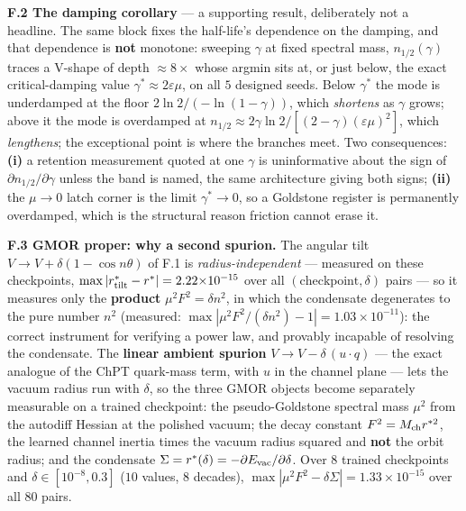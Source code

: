 \documentclass{article}
\begin{document}
\textbf{F.2 The damping corollary} --- a supporting result, deliberately not a headline. The same block fixes the half-life's dependence on the damping, and that dependence is \textbf{not} monotone: sweeping $\gamma$ at fixed spectral mass, $n_{1/2}(\gamma)$ traces a V-shape of depth $\approx8\times$ whose argmin sits at, or just below, the exact critical-damping value $\gamma^*\approx2\varepsilon\mu$, on all $5$ designed seeds. Below $\gamma^*$ the mode is underdamped at the floor $2\ln2/(-\ln(1-\gamma))$, which \emph{shortens} as $\gamma$ grows; above it the mode is overdamped at $n_{1/2}\approx2\gamma\ln2/[(2-\gamma)(\varepsilon\mu)^2]$, which \emph{lengthens}; the exceptional point is where the branches meet. Two consequences: \textbf{(i)} a retention measurement quoted at one $\gamma$ is uninformative about the sign of $\partial n_{1/2}/\partial\gamma$ unless the band is named, the same architecture giving both signs; \textbf{(ii)} the $\mu\to0$ latch corner is the limit $\gamma^*\to0$, so a Goldstone register is permanently overdamped, which is the structural reason friction cannot erase it.

\textbf{F.3 GMOR proper: why a second spurion.} The angular tilt $V\to V+\delta(1-\cos n\theta)$ of F.1 is \emph{radius-independent} --- measured on these checkpoints, $\max|r^*_{\rm tilt}-r^*|=2.22{\times}10^{-15}$ over all $(\text{checkpoint},\delta)$ pairs --- so it measures only the \textbf{product} $\mu^2F^2=\delta n^2$, in which the condensate degenerates to the pure number $n^2$ (measured: $\max|\mu^2F^2/(\delta n^2)-1|=1.03{\times}10^{-11}$): the correct instrument for verifying a power law, and provably incapable of resolving the condensate. The \textbf{linear ambient spurion} $V\to V-\delta\,(u\cdot q)$ --- the exact analogue of the ChPT quark-mass term, with $u$ in the channel plane --- lets the vacuum radius run with $\delta$, so the three GMOR objects become separately measurable on a trained checkpoint: the pseudo-Goldstone spectral mass $\mu^2$ from the autodiff Hessian at the polished vacuum; the decay constant $F^2=M_{\rm ch}r^{*2}$, the learned channel inertia times the vacuum radius squared and \textbf{not} the orbit radius; and the condensate $\Sigma=r^*(\delta)=-\partial E_{\rm vac}/\partial\delta$. Over $8$ trained checkpoints and $\delta\in[10^{-8},0.3]$ ($10$ values, $8$ decades), $\max|\mu^2F^2-\delta\Sigma|=1.33{\times}10^{-15}$ over all $80$ pairs.
\end{document}
